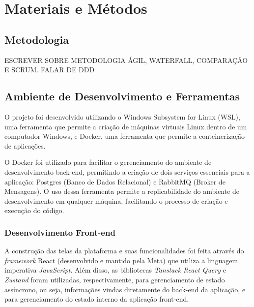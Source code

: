 \chapter{Materiais e Métodos}

\section{Metodologia}
ESCREVER SOBRE METODOLOGIA ÁGIL, WATERFALL, COMPARAÇÃO E SCRUM. FALAR DE DDD

\section{Ambiente de Desenvolvimento e Ferramentas}
O projeto foi desenvolvido utilizando o Windows Subsystem for Linux (WSL), uma ferramenta que permite a criação de máquinas virtuais Linux dentro de um computador Windows, e Docker, uma ferramenta que permite a conteinerização de aplicações.

O Docker foi utilizado para facilitar o gerenciamento do ambiente de desenvolvimento back-end, permitindo a criação de dois serviços essenciais para a aplicação: Postgres (Banco de Dados Relacional) e RabbitMQ (Broker de Mensagens). O uso dessa ferramenta permite a replicabilidade do ambiente de desenvolvimento em qualquer máquina, facilitando o processo de criação e execução do código.

\subsection{Desenvolvimento Front-end}
A construção das telas da plataforma e suas funcionalidades foi feita através do \textit{framework} React (desenvolvido e mantido pela Meta) que utiliza a linguagem imperativa \textit{JavaScript}. Além disso, as bibliotecas \textit{Tanstack React Query} e \textit{Zustand} foram utilizadas, respectivamente, para gerenciamento de estado assíncrono, ou seja, informações vindas diretamente do back-end da aplicação, e para gerenciamento do estado interno da aplicação front-end.

